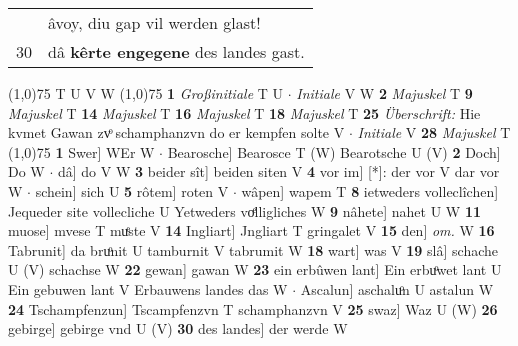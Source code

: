 \documentclass[8pt,a4paper,notitlepage]{article}
\begin{document}
\begin{table}[ht]
\begin{minipage}[t]{0.5\linewidth}
\begin{tabular}{rl}
 & âvoy, diu gap vil werden glast!\\ 
30 & dâ \textbf{kêrte engegene} des landes gast.\\ 
\end{tabular}
\scriptsize
\line(1,0){75} \newline
T U V W \newline
\line(1,0){75} \newline
\textbf{1} \textit{Großinitiale} T U   $\cdot$ \textit{Initiale} V W  \textbf{2} \textit{Majuskel} T  \textbf{9} \textit{Majuskel} T  \textbf{14} \textit{Majuskel} T  \textbf{16} \textit{Majuskel} T  \textbf{18} \textit{Majuskel} T  \textbf{25} \textit{Überschrift:} Hie kvmet Gawan zvͦ schamphanzvn do er kempfen solte V   $\cdot$ \textit{Initiale} V  \textbf{28} \textit{Majuskel} T  \newline
\line(1,0){75} \newline
\textbf{1} Swer] WEr W  $\cdot$ Bearosche] Bearosce T (W) Bearotsche U (V) \textbf{2} Doch] Do W  $\cdot$ dâ] do V W \textbf{3} beider sît] beiden siten V \textbf{4} vor im] [*]: der vor V dar vor W  $\cdot$ schein] sich U \textbf{5} rôtem] roten V  $\cdot$ wâpen] wapem T \textbf{8} ietweders volleclîchen] Jequeder site vollecliche U Yetweders voͤlligliches W \textbf{9} nâhete] nahet U W \textbf{11} muose] mvese T muͤste V \textbf{14} Ingliart] Jngliart T gringalet V \textbf{15} den] \textit{om.} W \textbf{16} Tabrunit] da bruͦnit U tamburnit V tabrumit W \textbf{18} wart] was V \textbf{19} slâ] schache U (V) schachse W \textbf{22} gewan] gawan W \textbf{23} ein erbûwen lant] Ein erbuͦwet lant U Ein gebuwen lant V Erbauwens landes das W  $\cdot$ Ascalun] aschaluͦn U astalun W \textbf{24} Tschampfenzun] Tscampfenzvn T schamphanzvn V \textbf{25} swaz] Waz U (W) \textbf{26} gebirge] gebirge vnd U (V) \textbf{30} des landes] der werde W \newline
\end{minipage}
\end{table}
\end{document}
